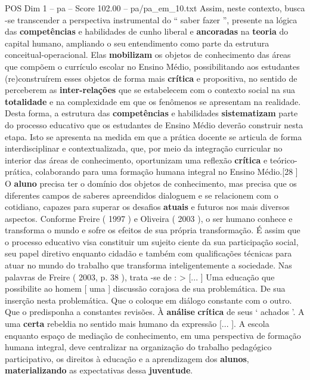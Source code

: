 \begin{textsample}{POS Dim 1 – pa – Score 102.00 – pa/pa\_em\_10.txt}
Assim, neste contexto, busca -se transcender a perspectiva instrumental do “ saber fazer ”, presente na lógica das \textbf{competências} e habilidades de cunho liberal e \textbf{ancoradas} na \textbf{teoria} do capital humano, ampliando o seu entendimento como parte da estrutura conceitual-operacional.
Elas \textbf{mobilizam} os objetos de conhecimento das áreas que compõem o currículo escolar no Ensino Médio, possibilitando aos estudantes (re)construírem esses objetos de forma mais \textbf{crítica} e propositiva, no sentido de perceberem as \textbf{inter-relações} que se estabelecem com o contexto social na sua \textbf{totalidade} e na complexidade em que os fenômenos se apresentam na realidade.
Desta forma, a estrutura das \textbf{competências} e habilidades \textbf{sistematizam} parte do processo educativo que os estudantes de Ensino Médio deverão construir nesta etapa.
Isto se apresenta na medida em que a prática docente se articula de forma interdisciplinar e contextualizada, que, por meio da integração curricular no interior das áreas de conhecimento, oportunizam uma reflexão \textbf{crítica} e teórico-prática, colaborando para uma formação humana integral no Ensino Médio.[28 ] O \textbf{aluno} precisa ter o domínio dos objetos de conhecimento, mas precisa que os diferentes campos de saberes apreendidos dialoguem e se relacionem com o cotidiano, capazes para superar os desafios \textbf{atuais} e futuros nos mais diversos aspectos.
Conforme Freire ( 1997 ) e Oliveira ( 2003 ), o ser humano conhece e transforma o mundo e sofre os efeitos de sua própria transformação.
É assim que o processo educativo visa constituir um sujeito ciente da sua participação social, seu papel diretivo enquanto cidadão e também com qualificações técnicas para atuar no mundo do trabalho que transforma inteligentemente a sociedade.
Nas palavras de Freire ( 2003, p. 38 ), trata -se de : > [... ] Uma educação que possibilite ao homem [ uma ] discussão corajosa de sua problemática.
De sua inserção nesta problemática.
Que o coloque em diálogo constante com o outro.
Que o predisponha a constantes revisões.
À \textbf{análise} \textbf{crítica} de seus ‘ achados ’.
A uma \textbf{certa} rebeldia no sentido mais humano da expressão [... ].
A escola enquanto espaço de mediação de conhecimento, em uma perspectiva de formação humana integral, deve centralizar na organização do trabalho pedagógico participativo, os direitos à educação e a aprendizagem dos \textbf{alunos}, \textbf{materializando} as expectativas dessa \textbf{juventude}.

\end{textsample}
